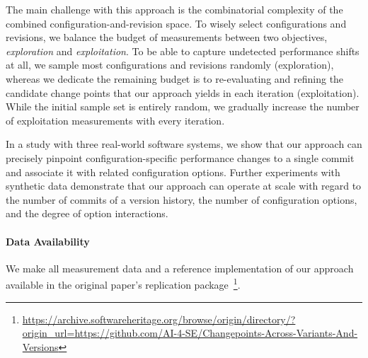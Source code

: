 \documentclass[utf8,biblatex]{lni}
\begin{document}
The main challenge with this approach is the combinatorial complexity of the combined configuration-and-revision space. To wisely select configurations and revisions, we balance the budget of measurements between two objectives, \textit{exploration} and \textit{exploitation}. To be able to capture undetected performance shifts at all, we sample most configurations and revisions randomly ({exploration}), whereas we dedicate the remaining budget is to re-evaluating and refining the candidate change points that our approach yields in each iteration ({exploitation}). While the initial sample set is entirely random, we gradually increase the number of exploitation measurements with every iteration. 


In a study with three real-world software systems, we show that our approach can precisely pinpoint configuration-specific performance changes to a single commit and associate it with related configuration options. Further experiments with synthetic data demonstrate that our approach can operate at scale with regard to the number of commits of a version history, the number of configuration options, and the degree of option interactions.

\paragraph{Data Availability} 
We make all measurement data and a reference implementation of our approach~\cite{muehlbauer_identifying_2020} available in the original paper's replication package~\footnote{\url{https://archive.softwareheritage.org/browse/origin/directory/?origin_url=https://github.com/AI-4-SE/Changepoints-Across-Variants-And-Versions}}.
\printbibliography
\end{document}
